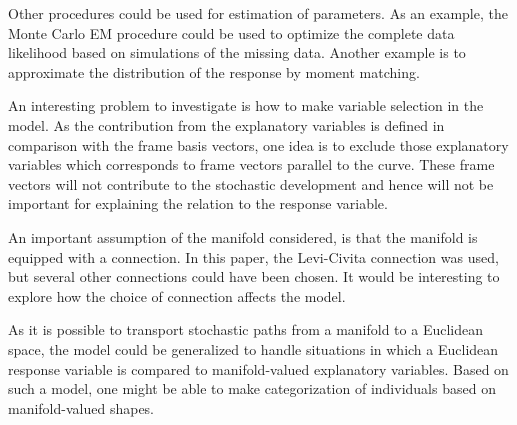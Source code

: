 \documentclass[runningheads,a4paper]{llncs}
\begin{document}
Other procedures could be used for estimation of parameters. As an example, the Monte Carlo EM procedure could be used to optimize the complete data likelihood based on simulations of the missing data. Another example is to approximate the distribution of the response by moment matching.

An interesting problem to investigate is how to make variable selection in the model. As the contribution from the explanatory variables is defined in comparison with the frame basis vectors, one idea is to exclude those explanatory variables which corresponds to frame vectors parallel to the curve. These frame vectors will not contribute to the stochastic development and hence will not be important for explaining the relation to the response variable.

 An important assumption of the manifold considered, is that the manifold is equipped with a connection. In this paper, the Levi-Civita connection was used, but several other connections could have been chosen. It would be interesting to explore how the choice of connection affects the model.

As it is possible to transport stochastic paths from a manifold to a Euclidean space, the model could be generalized to handle situations in which a Euclidean response variable is compared to manifold-valued explanatory variables. Based on such a model, one might be able to make categorization of individuals based on manifold-valued shapes.





%
\end{document}

